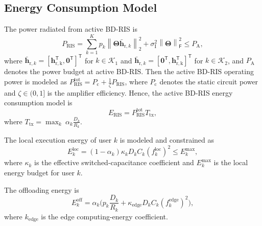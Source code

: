 \documentclass[conference]{IEEEtran}
\begin{document}
\subsection{Energy Consumption Model}

The power radiated from active BD-RIS is
\begin{equation}
P_\mathrm{RIS} = \sum_{k=1}^Kp_k\left\|\mathbf{\Theta}\bar{\mathbf{h}}_{\mathrm{r},k}\right\|_2^2
+ \sigma_\mathrm{I}^2\left\|\mathbf{\Theta}\right\|_\mathsf{F}^2\le P_\mathrm{A},
\end{equation}
where $\bar{\mathbf{h}}_{\mathrm{r},k} = [\mathbf{h}_{\mathrm{r,k}}^\mathsf{T},\mathbf{0}^\mathsf{T}]^\mathsf{T}$ for $k\in\mathcal{K}_1$ and $\bar{\mathbf{h}}_{\mathrm{r},k} = [\mathbf{0}^\mathsf{T},\mathbf{h}_{\mathrm{r,k}}^\mathsf{T}]^\mathsf{T}$ for $k\in\mathcal{K}_2$, and $P_\mathrm{A}$ denotes the power budget at active BD-RIS. Then the active BD-RIS operating power is modeled as $P_\mathrm{RIS}^\mathrm{tot} = P_\mathrm{c} + \frac{1}{\zeta}P_\mathrm{RIS}$, where $P_\mathrm{c}$ denotes the static circuit power and $\zeta\in(0,1]$ is the amplifier efficiency. Hence, the active BD-RIS energy consumption model is 
\begin{equation}
    E_\mathrm{RIS} = P_\mathrm{RIS}^\mathrm{tot}T_\mathrm{tx}, 
\end{equation}
where $T_\mathrm{tx} = \max_{k}~\alpha_k\frac{D_k}{R_k}$. 

The local execution energy of user $k$ is modeled and constrained as
\begin{equation}
E_k^{\mathrm{loc}}=(1-\alpha_k)\kappa_k D_k C_k (f_k^{\mathrm{loc}})^2\le E_k^\mathrm{max},
\end{equation}
where $\kappa_k$ is the effective switched-capacitance coefficient and $E_k^\mathrm{max}$ is the local energy budget for user $k$.

The offloading energy is
\begin{equation}
E_k^{\mathrm{off}}=\alpha_k \Big(p_k \frac{D_k}{R_k} + \kappa_\mathrm{edge}D_kC_k(f_k^\mathrm{edge})^2\Big),
\end{equation}
where $k_\mathrm{edge}$ is the edge computing-energy coefficient.

\end{document}
